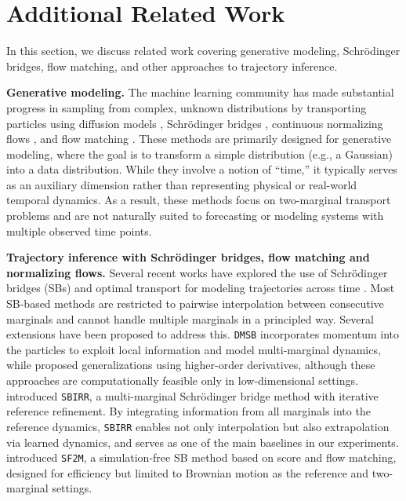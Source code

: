 
\section{Additional Related Work}
\label{app:related-work}
In this section, we discuss related work covering generative modeling, Schrödinger bridges, flow matching, and other approaches to trajectory inference.

\textbf{Generative modeling.} The machine learning community has made substantial progress in sampling from complex, unknown distributions by transporting particles using diffusion models \citep{ho2020denoising, song2019generative, song2020score}, Schrödinger bridges \citep{de2021diffusion, pavon2021data, Vargas2021, Wang2023}, continuous normalizing flows \citep{chen2018neural, grathwohl2018ffjord}, and flow matching \citep{lipman2022flow}. These methods are primarily designed for generative modeling, where the goal is to transform a simple distribution (e.g., a Gaussian) into a data distribution. While they involve a notion of “time,” it typically serves as an auxiliary dimension rather than representing physical or real-world temporal dynamics. As a result, these methods focus on two-marginal transport problems and are not naturally suited to forecasting or modeling systems with multiple observed time points.

\textbf{Trajectory inference with Schrödinger bridges, flow matching and normalizing flows.} 
Several recent works have explored the use of Schrödinger bridges (SBs) and optimal transport for modeling trajectories across time \citep{schiebinger2019optimal, yang2018scalable}. 
Most SB-based methods are restricted to pairwise interpolation between consecutive marginals and cannot handle multiple marginals in a principled way. Several extensions have been proposed to address this. \texttt{DMSB} \citep{chen2024deep} incorporates momentum into the particles to exploit local information and model multi-marginal dynamics, while \citet{hong2025trajectory} proposed generalizations using higher-order derivatives, although these approaches are computationally feasible only in low-dimensional settings. \citet{shen2024multi} introduced \texttt{SBIRR}, a multi-marginal Schrödinger bridge method with iterative reference refinement. By integrating information from all marginals into the reference dynamics, \texttt{SBIRR} enables not only interpolation but also extrapolation via learned dynamics, and serves as one of the main baselines in our experiments. \citet{tong2024simulation} introduced \texttt{SF2M}, a simulation-free SB method based on score and flow matching, designed for efficiency but limited to Brownian motion as the reference and two-marginal settings. 

